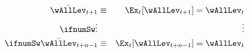 \begin{eqnarray*}
  \label{eq:ztBar}
    \bar{\wAllLev}_{t+1} & \equiv & \Ex_{t}[\wAllLev_{t+1}] = \wAllLev_{t}
\\ \ifnumSw  \vdots &  & \vdots \nonumber
\\ \ifnumSw  \bar{\wAllLev}_{t+n-1} & \equiv & \Ex_{t}[\wAllLev_{t+n-1}] = \wAllLev_{t}
\end{eqnarray*}
